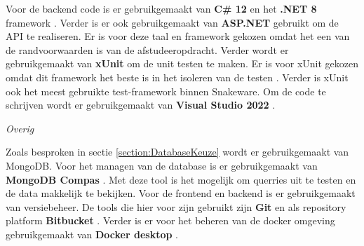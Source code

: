 \whitespace[2]
Voor de backend code is er gebruikgemaakt van \textbf{C\# 12} \parencite{CSharp} en het \textbf{.NET 8} framework \parencite{DotNet8}.
Verder is er ook gebruikgemaakt van \textbf{ASP.NET} \parencite{ASPNET} gebruikt om de API te realiseren.
Er is voor deze taal en framework gekozen omdat het een van de randvoorwaarden is van de afstudeeropdracht.
Verder wordt er gebruikgemaakt van \textbf{xUnit} \parencite{xUnit} om de unit testen te maken.
Er is voor xUnit gekozen omdat dit framework het beste is in het isoleren van de testen \parencite{IsolationTest}. 
Verder is xUnit ook het meest gebruikte test-framework binnen Snakeware.
Om de code te schrijven wordt er gebruikgemaakt van \textbf{Visual Studio 2022} \parencite{VisualStudio}.

\whitespace[2]
\textit{Overig}

\whitespace[2]
Zoals besproken in sectie \ref{section:DatabaseKeuze} wordt er gebruikgemaakt van MongoDB.
Voor het managen van de database is er gebruikgemaakt van \textbf{MongoDB Compas} \parencite{MongoDBCompas}.
Met deze tool is het mogelijk om querries uit te testen en de data makkelijk te bekijken.
Voor de frontend en backend is er gebruikgemaakt van versiebeheer.
De tools die hier voor zijn gebruikt zijn \textbf{Git} \parencite{Git} en als repository platform \textbf{Bitbucket} \parencite{BitBucket}.
Verder is er voor het beheren van de docker omgeving gebruikgemaakt van \textbf{Docker desktop} \Parencite{DockerDesktop}.
